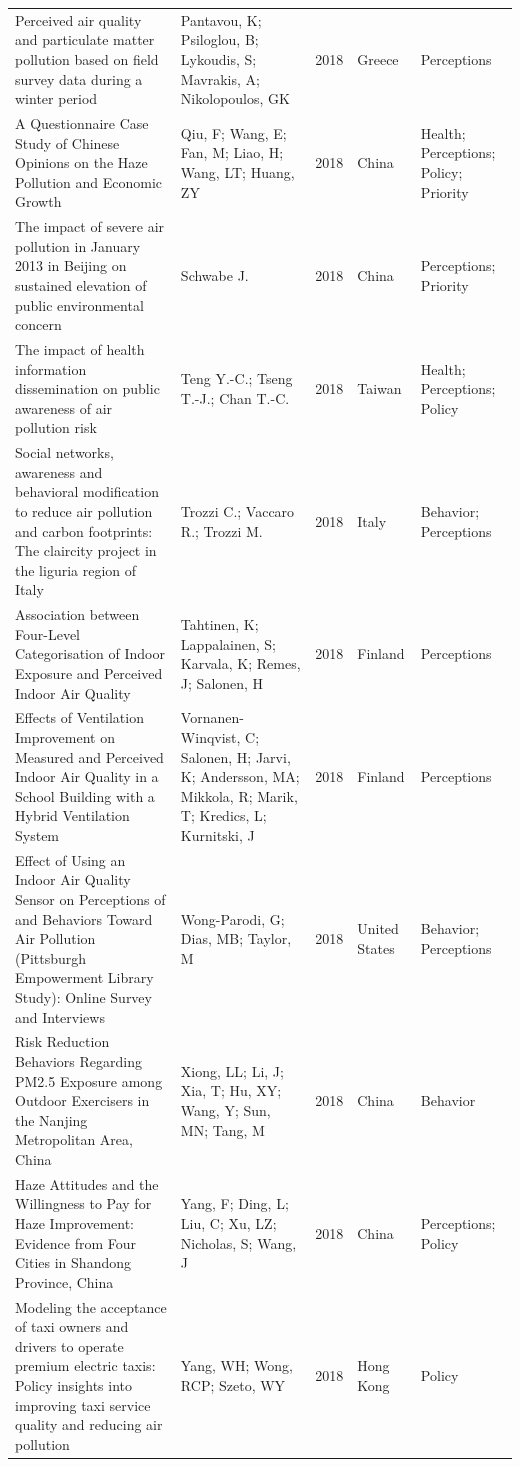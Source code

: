 {\begin{longtable}[t]{p{6cm}p{3cm}lp{3cm}p{3cm}}
Perceived air quality and particulate matter pollution based on field survey data during a winter period & Pantavou, K; Psiloglou, B; Lykoudis, S; Mavrakis, A; Nikolopoulos, GK & 2018 & Greece & Perceptions\\
A Questionnaire Case Study of Chinese Opinions on the Haze Pollution and Economic Growth & Qiu, F; Wang, E; Fan, M; Liao, H; Wang, LT; Huang, ZY & 2018 & China & Health; Perceptions; Policy; Priority\\
The impact of severe air pollution in January 2013 in Beijing on sustained elevation of public environmental concern & Schwabe J. & 2018 & China & Perceptions; Priority\\
The impact of health information dissemination on public awareness of air pollution risk & Teng Y.-C.; Tseng T.-J.; Chan T.-C. & 2018 & Taiwan & Health; Perceptions; Policy\\
\addlinespace
Social networks, awareness and behavioral modification to reduce air pollution and carbon footprints: The claircity project in the liguria region of Italy & Trozzi C.; Vaccaro R.; Trozzi M. & 2018 & Italy & Behavior; Perceptions\\
Association between Four-Level Categorisation of Indoor Exposure and Perceived Indoor Air Quality & Tahtinen, K; Lappalainen, S; Karvala, K; Remes, J; Salonen, H & 2018 & Finland & Perceptions\\
Effects of Ventilation Improvement on Measured and Perceived Indoor Air Quality in a School Building with a Hybrid Ventilation System & Vornanen-Winqvist, C; Salonen, H; Jarvi, K; Andersson, MA; Mikkola, R; Marik, T; Kredics, L; Kurnitski, J & 2018 & Finland & Perceptions\\
Effect of Using an Indoor Air Quality Sensor on Perceptions of and Behaviors Toward Air Pollution (Pittsburgh Empowerment Library Study): Online Survey and Interviews & Wong-Parodi, G; Dias, MB; Taylor, M & 2018 & United States & Behavior; Perceptions\\
Risk Reduction Behaviors Regarding PM2.5 Exposure among Outdoor Exercisers in the Nanjing Metropolitan Area, China & Xiong, LL; Li, J; Xia, T; Hu, XY; Wang, Y; Sun, MN; Tang, M & 2018 & China & Behavior\\
\addlinespace
Haze Attitudes and the Willingness to Pay for Haze Improvement: Evidence from Four Cities in Shandong Province, China & Yang, F; Ding, L; Liu, C; Xu, LZ; Nicholas, S; Wang, J & 2018 & China & Perceptions; Policy\\
Modeling the acceptance of taxi owners and drivers to operate premium electric taxis: Policy insights into improving taxi service quality and reducing air pollution & Yang, WH; Wong, RCP; Szeto, WY & 2018 & Hong Kong & Policy\\

\end{longtable}}
